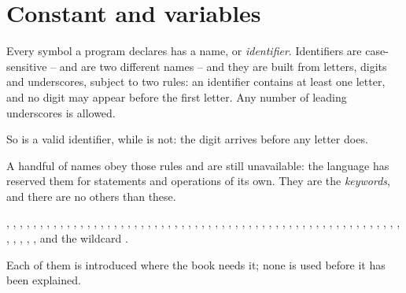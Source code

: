 \section{Constant and variables}
\label{sec:types:constants_variables}

Every symbol a program declares has a name, or \textit{identifier}. Identifiers
are case-sensitive --  and  are two different names --
and they are built from letters, digits and underscores, subject to two rules: an
identifier contains at least one letter, and no digit may appear before the first
letter. Any number of leading underscores is allowed.

So  is a valid identifier, while  is not: the digit
arrives before any letter does.


A handful of names obey those rules and are still unavailable: the language has
reserved them for statements and operations of its own. They are the
\textit{keywords}, and there are no others than these.

, , , , ,
, , , , ,
, , , , ,
, , , , ,
, , , , ,
, , , , , ,
, , , , ,
, , , , ,
, , , , ,
, , , , ,
, , , , ,
, , , , ,
, , , and the wildcard \token{\_}.


Each of them is introduced where the book needs it; none is used before it has
been explained.
